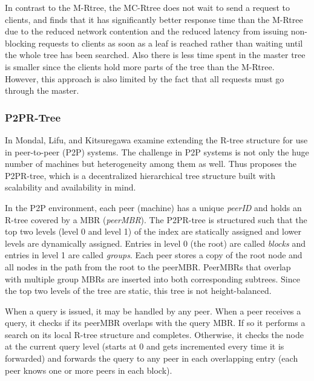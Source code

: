In contrast to the M-Rtree, the MC-Rtree does not wait to send a request to
clients, and \cite{schnitzer1999master} finds that it has significantly better 
response time than the M-Rtree due to the reduced network contention and the 
reduced latency from issuing non-blocking requests to clients as soon as a leaf 
is reached rather than waiting until the whole tree has been searched. Also 
there is less time spent in the master tree is smaller since the clients hold 
more parts of the tree than the M-Rtree. However, this approach is also limited
by the fact that all requests must go through the master.



\subsubsection{P2PR-Tree}
In \cite{mondal2005p2pr} Mondal, Lifu, and Kitsuregawa examine extending the 
R-tree structure for use in peer-to-peer (P2P) systems. The challenge in P2P 
systems is not only the huge number of machines but heterogeneity among them as 
well. Thus \cite{mondal2005p2pr} proposes the P2PR-tree, which is a 
decentralized hierarchical tree structure built with scalability and availability
in mind. 

In the P2P environment, each peer (machine) has a unique \emph{peerID} and holds
an R-tree covered by a MBR (\emph{peerMBR}). The P2PR-tree is structured
such that the top two levels (level 0 and level 1) of the index are statically 
assigned and lower levels are dynamically assigned. Entries in level 0 (the root)
are called \emph{blocks} and entries in level 1 are called \emph{groups}. Each 
peer stores a copy of the root node and all nodes in the path from the root to 
the peerMBR. PeerMBRs that overlap with multiple group MBRs are inserted into 
both corresponding subtrees. Since the top two levels of the tree are static, 
this tree is not height-balanced\cite{mondal2005p2pr}.

When a query is issued, it may be handled by any peer. When a peer receives a 
query, it checks if its peerMBR overlaps with the query MBR. If so it performs 
a search on its local R-tree structure and completes. Otherwise, it checks the 
node at the current query level (starts at 0 and gets incremented every time it
is forwarded) and forwards the query to any peer in each overlapping entry (each
peer knows one or more peers in each block).

